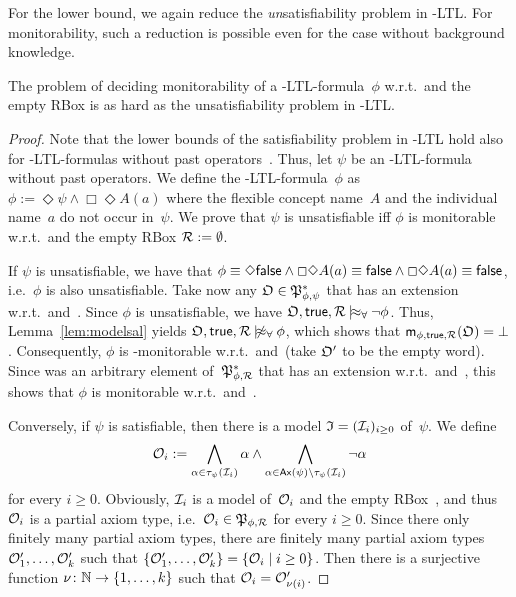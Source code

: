 \noindent
For the lower bound, we again reduce the \emph{un}satisfiability problem in
\ALC-LTL\@.  For monitorability, such a reduction is possible even for the case
without background knowledge.

\begin{lemma}\label{lem:monitorability-lower}
    The problem of deciding monitorability of a \SHOQ-LTL-formula~$\phi$
    w.r.t.~\true and the empty RBox is as hard as the unsatisfiability problem
    in \ALC-LTL\@.
\end{lemma}

\begin{proof}
    Note that the lower bounds of the satisfiability problem in \ALC-LTL hold
    also for \ALC-LTL-formulas without past operators~\cite{BaGL-ToCL12}.
    Thus, let $\psi$ be an \ALC-LTL-formula without past operators.  We define
    the \SHOQ-LTL-formula~$\phi$ as $\phi:=\Diamond\psi\land\Box\Diamond A(a)$
    where the flexible concept name~$A$ and the individual name~$a$ do not occur
    in~$\psi$.  We prove that $\psi$ is unsatisfiable iff $\phi$ is monitorable
    w.r.t.~\true and the empty RBox $\mathcal{R}:=\emptyset$.

    If $\psi$ is unsatisfiable, we have that
    $\phi\equiv\Diamond\mathsf{false}\land\Box\Diamond A(a)\equiv\mathsf{false}\land\Box\Diamond A(a)\equiv\mathsf{false}$,
    i.e.~$\phi$ is also unsatisfiable.  Take now any $\mathfrak{O}\in\mathfrak{P}_{\phi,\psi}^*$
    that has an extension w.r.t.~\true and~\Rmc.  Since $\phi$ is unsatisfiable,
    we have $\Omf,\true,\Rmc\modelsal\lnot\phi$.  Thus, Lemma~\ref{lem:modelsal}
    yields $\Omf,\true,\Rmc\notmodelsal\phi$, which shows that
    $\mathsf{m}_{\phi,\mathsf{true},\mathcal{R}}(\mathfrak{O})=\bot$.  Consequently, $\phi$ is
    \Omf-monitorable w.r.t.~\true and~\Rmc (take $\mathfrak{O}'$ to be the empty word).
    Since \Omf was an arbitrary element of~$\mathfrak{P}_{\phi,\mathcal{R}}^*$ that has an
    extension w.r.t.~\true and~\Rmc, this shows that $\phi$ is monitorable
    w.r.t.~\true and~\Rmc.

    Conversely, if $\psi$ is satisfiable, then there is a model
    $\mathfrak{I}=(\mathcal{I}_i)_{i\ge 0}$ of~$\psi$.  We define
    \[\mathcal{O}_i:=\bigwedge_{\alpha\in\tau_\psi(\mathcal{I}_i)}\alpha\land\bigwedge_{\alpha\in\operatorname{\mathsf{Ax}}(\psi)\setminus\tau_\psi(\mathcal{I}_i)}\lnot\alpha\]
    for every $i\ge 0$.  Obviously, $\mathcal{I}_i$ is a model of~$\mathcal{O}_i$ and the
    empty RBox~\Rmc, and thus $\mathcal{O}_i$ is a partial axiom type,
    i.e.~$\mathcal{O}_i\in\mathfrak{P}_{\phi,\mathcal{R}}$ for every $i\ge 0$.  Since there only
    finitely many partial axiom types, there are finitely many partial axiom
    types $\mathcal{O}_1',\dots,\mathcal{O}_k'$ such that
    $\{\mathcal{O}_1',\dots,\mathcal{O}_k'\}=\{\mathcal{O}_i\mid i\ge 0\}$.  Then there is a
    surjective function $\nu\colon\mathbb{N}\to\{1,\dots,k\}$ such that
    $\mathcal{O}_i=\mathcal{O}_{\nu(i)}'$.


\end{proof}
